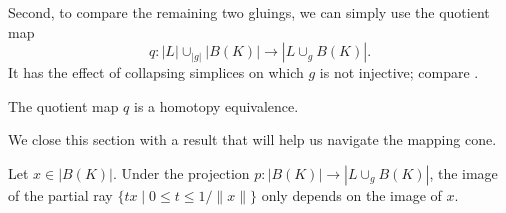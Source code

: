 \documentclass[a4paper,english,cleveref,autoref,thm-restate,nolineno]{socg-lipics-v2021}
\newcommand{\geomreal}[1] { |#1| } %
\newcommand{\cone}[1] { C(#1) } %
\newif\iffullversion
\newcommand{\fullonly}[1]{\iffullversion #1\fi}
\newcommand{\shortonly}[1]{\iffullversion\else #1\fi}
\begin{document}
Second, to compare the remaining two gluings, we can simply use the quotient map
\[
q\colon \geomreal{L}\cup_{\geomreal{g}}\geomreal{B(K)} \to \geomreal{L\cup_g B(K)}.
\]
It has the effect of collapsing simplices on which $g$ is not injective; compare .

\fullonly{
\begin{proposition}[%
	name={proof p.~\pageref{proof:equivalencemappingcones}},%
	restate=equivalencemappingcones%
	]
	\label{prop:equivalencemappingcones}
	The quotient map $q$ is a homotopy equivalence.
\end{proposition}
}

\fullonly{
	Equipped with this explicit homotopy equivalence, the simplicial mapping cone $\geomreal{L\cup_g B(K)}$ can be endowed with a point location routine, provided it has already been implemented in $L$ and $B(K)$.
	Given a point in $\cone{f}=\geomreal{L}\cup_f B^{d+1}$, we first compute its image in $\cone{\geomreal{g}}=\geomreal{L}\cup_{\geomreal{g}}B^{d+1}$ via \Cref{eq:homotopy_equivalence_cones}.
	If it lies inside the ball, we locate it in $B(K)$, and return its carrier and barycentric coordinates, after potentially identifying vertices under $g$.
	If the image lies on the boundary $\geomreal{L}$, we apply the point location routine for $L$.
}

\shortonly{
\begin{proposition}
	\label{prop:equivalencemappingcones}
	The quotient map $q$ is a homotopy equivalence.
\end{proposition}
}

We close this section with a result that will help us navigate the mapping cone.

\fullonly{
\begin{lemma}[%
	name={proof p.~\pageref{proof:raydescendstoquotient}},%
	restate=raydescendstoquotient%
	]
	\label{lem:raydescendstoquotient}
	Let $x\in\geomreal{B(K)}$.
	Under the projection $p\colon\geomreal{B(K)}\to\geomreal{L\cup_g B(K)}$, the image of the partial ray $\{tx\mid 0\leq t\leq 1/\|x\|\}$ only depends on the image of $x$.
\end{lemma}
}

\shortonly{
\begin{lemma}
	\label{lem:raydescendstoquotient}
	Let $x\in\geomreal{B(K)}$.
	Under the projection $p\colon\geomreal{B(K)}\to\geomreal{L\cup_g B(K)}$, the image of the partial ray $\{tx\mid 0\leq t\leq 1/\|x\|\}$ only depends on the image of $x$.
\end{lemma}
}
\end{document}
